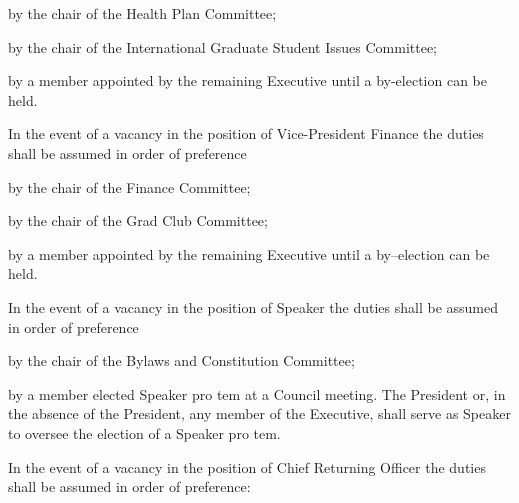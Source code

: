 \begin{longenum}[ label*=\thesubsection.\arabic*., align=left]
\begin{longenum}[ label*=\arabic*., align=left]
\begin{longenum}[ label*=\arabic*., align=left]
				\item by the chair of the Health Plan Committee;
				\item by the chair of the International Graduate Student Issues Committee;
				\item by a member appointed by the remaining Executive until a by-election can be held.
			\end{longenum}
			\item In the event of a vacancy in the position of Vice-President Finance the duties shall be assumed in order of preference
			\begin{longenum}[ label*=\arabic*., align=left]
				\item by the chair of the Finance Committee;
				\item by the chair of the Grad Club Committee;
				\item by a member appointed by the remaining Executive until a by--election can be held.
			\end{longenum}
			\item In the event of a vacancy in the position of Speaker the duties shall be assumed in order of preference
			\begin{longenum}[ label*=\arabic*., align=left]
				\item by the chair of the Bylaws and Constitution Committee;
				\item by a member elected Speaker pro tem at a Council meeting. The President or, in the absence of the President, any member of the Executive, shall serve as Speaker to oversee the election of a Speaker pro tem.
			\end{longenum}
			\item In the event of a vacancy in the position of Chief Returning Officer the duties shall be assumed in order of preference:

\end{longenum}
\end{longenum}
